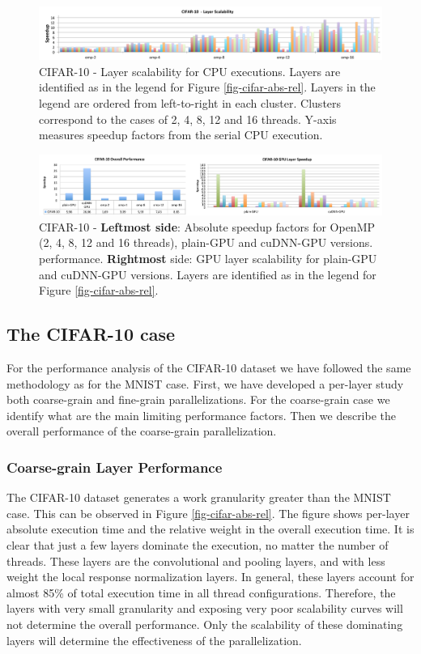 \begin{figure}[]
\includegraphics[width=\textwidth]{figures/cifar-scalability-layer.pdf}
\caption{CIFAR-10 - Layer scalability for CPU executions. Layers are identified as in the legend for Figure \ref{fig-cifar-abs-rel}. Layers in the legend are ordered from left-to-right in each cluster. Clusters correspond to the cases of 2, 4, 8, 12 and 16 threads. Y-axis measures speedup factors from the serial CPU execution.}
\label{fig-cifar-scalability}
\end{figure}

\begin{figure}[]
\includegraphics[width=\textwidth]{figures/cifar-abs-perf+gpu-layer.pdf}
\caption{CIFAR-10 - \textbf{Leftmost side}: Absolute speedup factors for OpenMP (2, 4, 8, 12 and 16 threads), plain-GPU and cuDNN-GPU versions. performance. \textbf{Rightmost} side: GPU layer scalability for plain-GPU and cuDNN-GPU versions. Layers are identified as in the legend for Figure \ref{fig-cifar-abs-rel}.}
\label{fig-cifar-overall}
\end{figure}

\subsection{The CIFAR-10 case}
For the performance analysis of the CIFAR-10 dataset we have followed the 
same methodology as for the MNIST case. First, we have developed a 
per-layer study both coarse-grain and fine-grain parallelizations. 
For the coarse-grain case we identify what are the main limiting 
performance factors. Then we describe the overall performance of the 
coarse-grain parallelization. 

\subsubsection{Coarse-grain Layer Performance}
The CIFAR-10 dataset generates a work granularity greater than 
the MNIST case. This can be observed in Figure \ref{fig-cifar-abs-rel}. 
The figure shows per-layer absolute execution time and the relative 
weight in the overall execution time. It is clear that just a few 
layers dominate the execution, no matter the number of threads. 
These layers are the convolutional and pooling layers, and with 
less weight the local response normalization layers. In general, 
these layers account for almost 85\% of total execution time in 
all thread configurations. Therefore, the layers with very small 
granularity and exposing very poor scalability curves will not 
determine the overall performance. Only the scalability of these 
dominating layers will determine the effectiveness of the 
parallelization.

